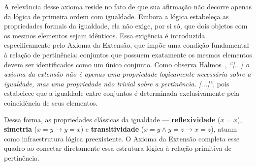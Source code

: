 A relevância desse axioma reside no fato de que sua afirmação não decorre apenas da lógica de primeira ordem com igualdade. Embora a lógica estabeleça as propriedades formais da igualdade, ela não exige, por si só, que dois objetos com os mesmos elementos sejam idênticos. Essa exigência é introduzida especificamente pelo Axioma da Extensão, que impõe uma condição fundamental à relação de pertinência: conjuntos que possuem exatamente os mesmos elementos devem ser identificados como um único conjunto. Como observa Halmos~\cite[p.~4]{halmos2001}, \textit{``[...] o axioma da extensão não é apenas uma propriedade logicamente necessária sobre a igualdade, mas uma propriedade não trivial sobre a pertinência. [...]''}, pois estabelece que a igualdade entre conjuntos é determinada exclusivamente pela coincidência de seus elementos.

Dessa forma, as propriedades clássicas da igualdade — \textbf{reflexividade} ($x = x$), \textbf{simetria} ($x = y \rightarrow y = x$) e \textbf{transitividade} ($x = y \land y = z \rightarrow x = z$), atuam como infraestrutura lógica preexistente. O Axioma da Extensão completa esse quadro ao conectar diretamente essa estrutura lógica à relação primitiva de pertinência.
